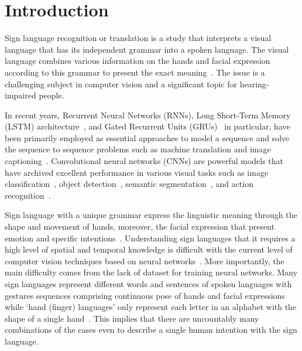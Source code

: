 \documentclass[10pt,twocolumn,letterpaper]{article}
\begin{document}
\section{Introduction}
Sign language recognition or translation is a study that interprets a visual language that has its independent grammar into a spoken language. The visual language combines various information on the hands and facial expression according to this grammar to present the exact meaning~\cite{ForsterSHKZPN12,von2008significance}. The issue is a challenging subject in computer vision and a significant topic for hearing-impaired people.

In recent years, Recurrent Neural Networks (RNNs), Long Short-Term Memory (LSTM) architecture~\cite{HochreiterS97}, and  Gated Recurrent Units (GRUs)~\cite{ChovGBBSB14} in particular, have been primarily employed as essential approaches to model a sequence and solve the sequence to sequence problems such as machine translation and image captioning~\cite{dai2017contrastive,liu2017attention,SutskeverVL14,xu2015show}. Convolutional neural networks (CNNs) are powerful models that have archived excellent performance in various visual tasks such as image classification~\cite{husqueeze,huang2017densely}, object detection~\cite{gao2017dynamic,redmon2016you}, semantic segmentation~\cite{long2015fully,zhang2018context}, and action recognition~\cite{donahue2015long,luvizon20182d}.

Sign language with a unique grammar express the linguistic meaning through the shape and movement of hands, moreover, the facial expression that present emotion and specific intentions~\cite{von2008significance}. Understanding sign languages that it requires a high level of spatial and temporal knowledge is difficult with the current level of computer vision techniques based on neural networks~\cite{DongLY15,ForsterSHKZPN12,gattupalli2016evaluation,KishoreSK14,KollerFN15,koller2017re,StarnerP95}.
More importantly, the main difficulty comes from the lack of dataset for training neural networks. Many sign languages represent different words and sentences of spoken languages with gestures sequences comprising continuous pose of hands and facial expressions while `hand (finger) languages' only represent each letter in an alphabet with the shape of a single hand~\cite{CamgozHKNB18}. This implies that there are uncountably many combinations of the cases even to describe a single human intention with the sign language.
\end{document}
